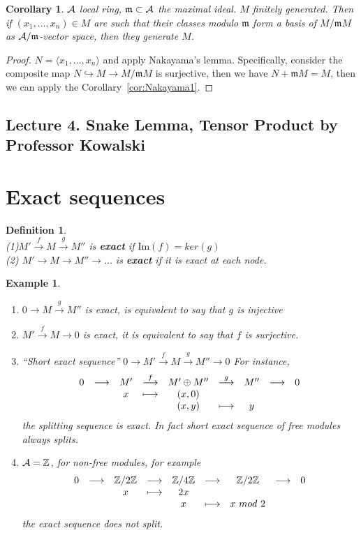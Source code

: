 \documentclass[11pt]{article}
\newtheorem{cor}[thm]{Corollary}
\newtheorem{dfn}[thm]{Definition}
\newtheorem{ex}[thm]{Example}
\newcommand{\intg}{\mathbb Z}
\newcommand{\scm}{{\mathfrak m}}
\newcommand{\cala}{{\cal A}}
\newcommand{\rta}{\rightarrow}
\newcommand{\lrta}{\longrightarrow}
\newcommand{\lgl}{\langle}
\newcommand{\rgl}{\rangle}
\newcommand{\inj}{\hookrightarrow}
\begin{document}
\begin{cor}\label{cor:Nakayama}
$\cala$ local ring, $\scm\subset \cala$ the maximal ideal. $M$ finitely generated. Then if $(x_1,...,x_n)\in M$ are such that their classes modulo $\scm$ form a basis of $M/\scm M$ as $\cala/\scm$-vector space, then they generate $M$.
\end{cor}

\begin{proof}
$N=\lgl x_1,...,x_n\rgl$ and apply Nakayama's lemma. Specifically, consider the composite map $N\inj M\lrta M/\scm M$ is surjective, then we have $N+\scm M=M$, then we can apply the Corollary~\ref{cor:Nakayama1}.
\end{proof}
\subsection{Lecture 4. Snake Lemma, Tensor Product by Professor Kowalski}
\section*{Exact sequences}
\begin{dfn}\ \\
(1)$M'\overset{f}{\rta} M\overset{g}{\rta} M''$ is \textbf{exact} if $\text{Im}(f)=ker(g)$\\
(2) $M'\rta M\rta M''\rta...$ is \textbf{exact} if it is exact at each node.
\end{dfn}

\begin{ex}\ 
\begin{enumerate}
\item $0\lrta M\overset{g}{\lrta} M''$ is exact, is equivalent to say that $g$ is injective
\item $M'\overset{f}{\lrta}M\lrta 0$ is exact, it is equivalent to say that $f$ is surjective.
\item ``Short exact sequence'' $0\lrta M'\overset{f}{\lrta}M\overset{g}{\lrta}M'' \lrta0$ For instance, 
$$
\begin{array}{ c c c c c c c c c}
0 & \longrightarrow  & M' & \overset{f}{\longrightarrow } & M'\oplus M'' & \overset{g}{\longrightarrow } & M'' & \longrightarrow  & 0\\
 &  & x &\longmapsto  & (x,0) &  &  &  & \\
 &  &  &  & (x,y) & \longmapsto & y &  &
\end{array}
$$
 the splitting sequence is exact. In fact short exact sequence of free modules always splits.
 \item $\cala=\intg$, for non-free modules, for example
 $$
\begin{array}{ c c c c c c c c c}
0 & \longrightarrow  & \intg/2\intg & \longrightarrow  & \intg/4\intg & \longrightarrow  & \intg/2\intg & \longrightarrow  & 0\\
 &  & x &\longmapsto  & 2x &  &  &  & \\
 &  &  &  & x & \longmapsto & x\  mod\ 2 &  &
\end{array}
$$
the exact sequence does not split.
\end{enumerate}
\end{ex}
\end{document}
